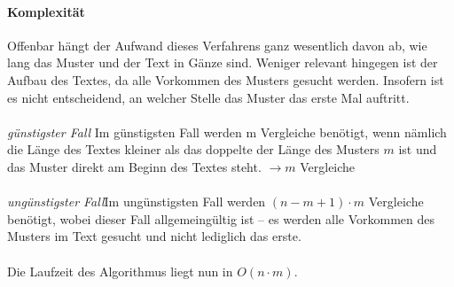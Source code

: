\documentclass[11pt,a4paper]{scrartcl}
\begin{document}
\paragraph{Komplexität}
Offenbar hängt der Aufwand dieses Verfahrens ganz wesentlich davon ab, wie lang das Muster und der Text in Gänze sind. Weniger relevant hingegen ist der Aufbau des Textes, da alle Vorkommen des Musters gesucht werden. Insofern ist es nicht entscheidend, an welcher Stelle das Muster das erste Mal auftritt. \\\\
\textit{günstigster Fall} \quad Im günstigsten Fall werden m Vergleiche benötigt, wenn nämlich die Länge des Textes kleiner als das doppelte der Länge des Musters $m$ ist und das Muster direkt am Beginn des Textes steht. $\to m$ Vergleiche 
\\\\ \textit{ungünstigster Fall}\quad Im ungünstigsten Fall werden $(n-m+1) \cdot m$ Vergleiche benötigt, wobei dieser Fall allgemeingültig ist -- es werden alle Vorkommen des Musters im Text gesucht und nicht lediglich das erste. \\\\
Die Laufzeit des Algorithmus liegt nun in $O(n \cdot m)$.
\end{document}
